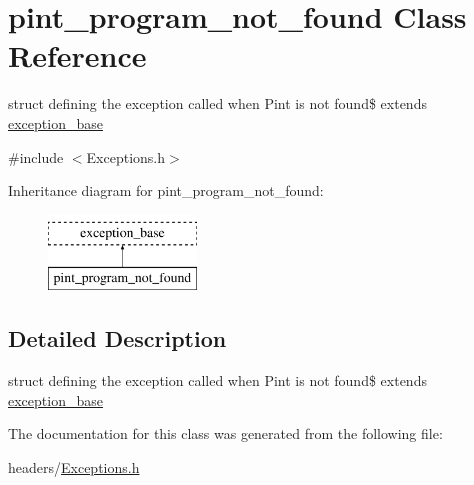 \hypertarget{structpint__program__not__found}{\section{pint\-\_\-program\-\_\-not\-\_\-found \-Class \-Reference}
\label{structpint__program__not__found}
}


struct defining the exception called when \-Pint is not found\$ extends \hyperlink{structexception__base}{exception\-\_\-base}  




{\ttfamily \#include $<$\-Exceptions.\-h$>$}

\-Inheritance diagram for pint\-\_\-program\-\_\-not\-\_\-found\-:\begin{figure}[H]
\begin{center}
\leavevmode
\includegraphics[height=2.000000cm]{structpint__program__not__found}
\end{center}
\end{figure}


\subsection{\-Detailed \-Description}
struct defining the exception called when \-Pint is not found\$ extends \hyperlink{structexception__base}{exception\-\_\-base} 

\-The documentation for this class was generated from the following file\-:\begin{DoxyCompactItemize}
\item 
headers/\hyperlink{_exceptions_8h}{\-Exceptions.\-h}\end{DoxyCompactItemize}
